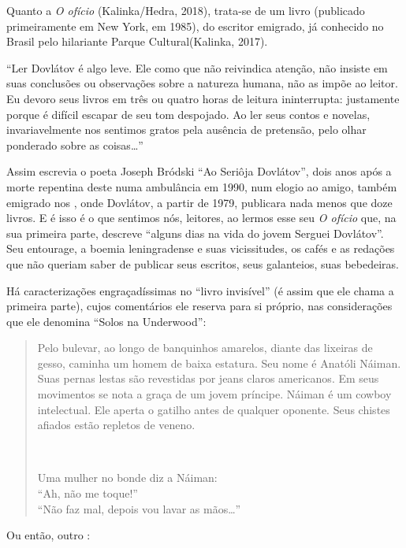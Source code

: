 Quanto a \emph{O ofício} (Kalinka/Hedra, 2018), trata-se de um livro (publicado primeiramente em New York, em 1985), do escritor emigrado, já conhecido no Brasil pelo hilariante Parque Cultural(Kalinka, 2017).

``Ler Dovlátov é algo leve. Ele como que não reivindica atenção, não insiste em suas conclusões ou observações sobre a natureza humana, não as impõe ao leitor. Eu devoro seus livros em três ou quatro horas de leitura ininterrupta: justamente porque é difícil escapar de seu tom despojado. Ao ler seus contos e novelas, invariavelmente nos sentimos gratos pela ausência de pretensão, pelo olhar ponderado sobre as coisas\ldots{}''

Assim escrevia o poeta Joseph Bródski  ``Ao Seriôja Dovlátov'', dois anos após a morte repentina deste numa ambulância em 1990, num elogio ao amigo, também emigrado nos , onde Dovlátov, a partir de 1979, publicara nada menos que doze livros. E é isso é o que sentimos nós, leitores, ao lermos esse seu \emph{O ofício} que, na sua primeira parte, descreve ``alguns dias na vida do jovem Serguei Dovlátov''. Seu entourage, a boemia leningradense e suas vicissitudes, os cafés e as redações que não queriam saber de publicar seus escritos, seus galanteios, suas bebedeiras. 

Há caracterizações engraçadíssimas no ``livro invisível'' (é assim que ele chama a primeira parte), cujos comentários ele reserva para si próprio, nas considerações que ele denomina ``Solos na Underwood'': 

\begin{quote}
Pelo bulevar, ao longo de banquinhos amarelos, diante das lixeiras de gesso, caminha um homem de baixa estatura. Seu nome é Anatóli Náiman.
Suas pernas lestas são revestidas por jeans claros americanos. Em seus movimentos se nota a graça de um jovem príncipe. Náiman é um cowboy intelectual. Ele aperta o gatilho antes de qualquer oponente. Seus chistes afiados estão repletos de veneno. 

\begin{center}
\\
\end{center}
Uma mulher no bonde diz a Náiman: \\
``Ah, não me toque!'' \\
``Não faz mal, depois vou lavar as mãos\ldots{}''
\end{quote}

Ou então, outro :

